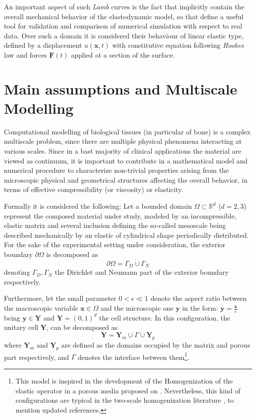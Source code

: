 An important aspect of such \textit{Lamb} curves is the fact that implicitly contain the overall mechanical behavior of the elastodynamic model, so that define a useful tool for validation and comparison of numerical simulation with respect to real data. Over such a domain it is considered their behaviour of linear elastic type, defined by a displacement $u(\mathbf{x},t)$ with constitutive equation following \textit{Hookes} law and forces $\mathbf{F}(t)$ applied at a section of the surface.

\section{Main assumptions and Multiscale Modelling}

Computational modelling of biological tissues (in particular of bone) is a complex multiscale problem, since there are multiple physical phenomena interacting at various scales. Since in a bast majority of clinical applications the material are viewed as continuum, it is important to contribute in a mathematical model and numerical procedure to characterize non-trivial properties arising from the microscopic physical and geometrical structures affecting the overall behavior, in terms of effective compressibility (or viscosity) or elasticity. 

Formally it is considered the following:
Let a bounded domain $\Omega \subset \mathbb{R}^d$ ($d = 2,3$) represent the composed material under study, modeled by an incompressible, elastic matrix and several inclusion defining the so-called mesoscale being described mechanically by an elastic of cylindrical shape periodically distributed.
For the sake of the experimental setting under consideration, the exterior boundary $\partial \Omega$ is decomposed as
\begin{equation*}
	\partial \Omega = \Gamma_D \dot\cup \Gamma_N
\end{equation*}
denoting $\Gamma_D, \Gamma_N$ the Dirichlet and Neumann part of the exterior boundary respectively.

Furthermore, let the small parameter $0 < \epsilon \ll 1$ denote the aspect ratio between the macroscopic variable $\mathbf{x} \in \Omega$ and the microscopic one $\mathbf{y}$ in the form: $\mathbf{y} = \frac{\mathbf{x}}{\epsilon}$ being $\mathbf{y} \in \mathbf{Y}$ and $\mathbf{Y} = (0,1)^d$ the cell structure. In this configuration, the unitary cell $\mathbf{Y}$, can be decomposed as
\begin{equation*}
	\mathbf{Y} = \mathbf{Y}_m \cup \Gamma \cup \mathbf{Y}_p 
\end{equation*}
where $\mathbf{Y}_m$ and $\mathbf{Y}_p$ are defined as the domains occupied by the matrix and porous part respectively, and $\Gamma$ denotes the interface between them\footnote{This model is inspired in the development of the Homogenization of the elastic operator in a porous media proposed on \cite{christensen1982theory}. Nevertheless, this kind of configurations are typical in the two-scale homogenization literature \cite{panasenko2005multi-scale}, \cite{Boughammoura2013} to mention updated references.}.

